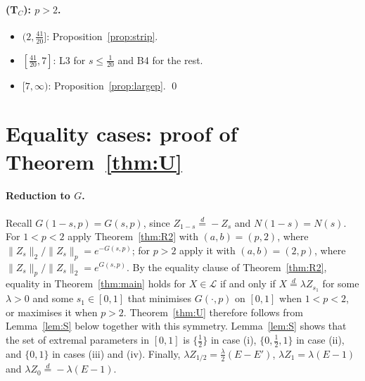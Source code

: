\documentclass[11pt]{article}
\theoremstyle{remark}
\newcommand{\eqd}{\overset{d}{=}}
\begin{document}
\paragraph{(T$_C$): $p>2$.}
\begin{itemize}
\item $(2,\frac{41}{20}]$: Proposition~\ref{prop:strip}.
\item $[\frac{41}{20},7]$: L3 for $s\le\frac1{20}$ and B4 for the rest.
\item $[7,\infty)$: Proposition~\ref{prop:largep}. \qed
\end{itemize}


\section{\texorpdfstring{Equality cases: proof of Theorem~\ref{thm:U}}{Equality cases}}\label{sec:equality}

\paragraph{Reduction to $G$.} Recall $G(1-s,p)=G(s,p)$, since $Z_{1-s}\eqd-Z_s$ and $N(1-s)=N(s)$. For $1<p<2$ apply Theorem~\ref{thm:R2} with $(a,b)=(p,2)$, where $\|Z_s\|_2/\|Z_s\|_p=e^{-G(s,p)}$; for $p>2$ apply it with $(a,b)=(2,p)$, where $\|Z_s\|_p/\|Z_s\|_2=e^{G(s,p)}$. By the equality clause of Theorem~\ref{thm:R2}, equality in Theorem~\ref{thm:main} holds for $X\in\mathcal L$ if and only if $X\eqd\lambda Z_{s_1}$ for some $\lambda>0$ and some $s_1\in[0,1]$ that minimises $G(\cdot,p)$ on $[0,1]$ when $1<p<2$, or maximises it when $p>2$. Theorem~\ref{thm:U} therefore follows from Lemma~\ref{lem:S} below together with this symmetry. Lemma~\ref{lem:S} shows that the set of extremal parameters in $[0,1]$ is $\{\frac12\}$ in case (i), $\{0,\frac12,1\}$ in case (ii), and $\{0,1\}$ in cases (iii) and (iv). Finally, $\lambda Z_{1/2}=\frac\lambda2(E-E')$, $\lambda Z_1=\lambda(E-1)$ and $\lambda Z_0\eqd-\lambda(E-1)$.
\end{document}
